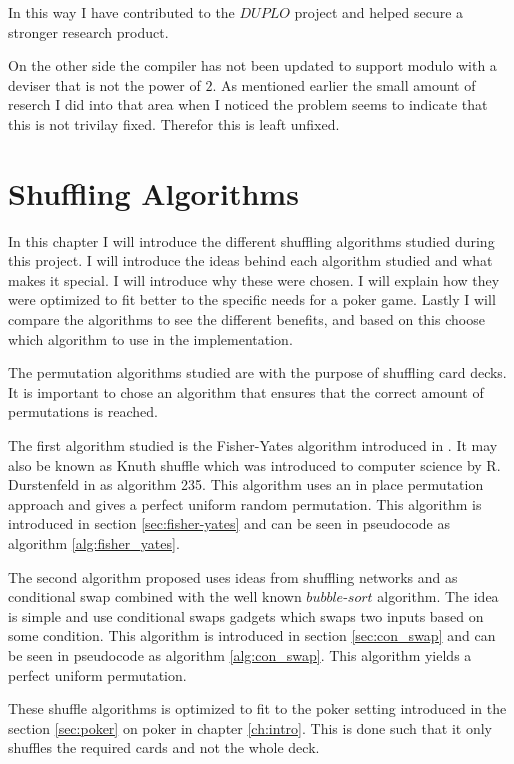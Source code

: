 \documentclass[twoside,11pt,openright]{report}
\begin{document}
In this way I have contributed to the $DUPLO$ project and helped secure a stronger research product.

On the other side the compiler has not been updated to support modulo with a deviser that is not the power of $2$. As mentioned earlier the small amount of reserch I did into that area when I noticed the problem seems to indicate that this is not trivilay fixed. Therefor this is leaft unfixed.



\chapter{Shuffling Algorithms}
\label{ch:shuffle}
In this chapter I will introduce the different shuffling algorithms studied during this project. I will introduce the ideas behind each algorithm studied and what makes it special. I will introduce why these were chosen. I will explain how they were optimized to fit better to the specific needs for a poker game. Lastly I will compare the algorithms to see the different benefits, and based on this choose which algorithm to use in the implementation.

The permutation algorithms studied are with the purpose of shuffling card decks. It is important to chose an algorithm that ensures that the correct amount of permutations is reached.

The first algorithm studied is the Fisher-Yates algorithm introduced in . It may also be known as Knuth shuffle which was introduced to computer science by R. Durstenfeld in  as algorithm 235. This algorithm uses an in place permutation approach and gives a perfect uniform random permutation. This algorithm is introduced in section \ref{sec:fisher-yates} and can be seen in pseudocode as algorithm \ref{alg:fisher_yates}.

The second algorithm proposed uses ideas from shuffling networks and  as conditional swap combined with the well known $bubble\text{-}sort$ algorithm. The idea is simple and use conditional swaps gadgets which swaps two inputs based on some condition. This algorithm is introduced in section \ref{sec:con_swap} and can be seen in pseudocode as algorithm \ref{alg:con_swap}. This algorithm yields a perfect uniform permutation.

These shuffle algorithms is optimized to fit to the poker setting introduced in the section \ref{sec:poker} on poker in chapter \ref{ch:intro}. This is done such that it only shuffles the required cards and not the whole deck.
\end{document}
